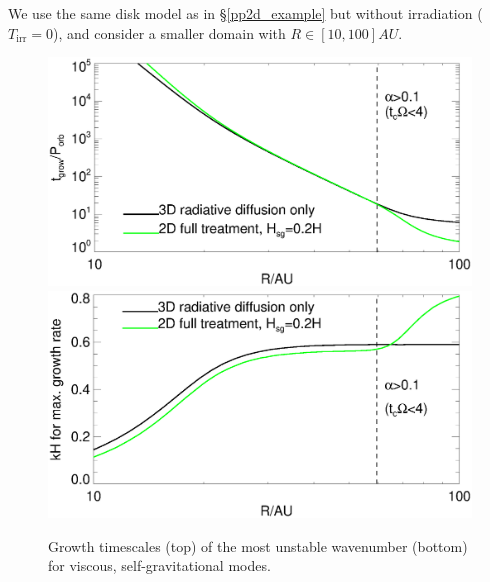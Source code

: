 We use the same disk model as in \S\ref{pp2d_example} but without
irradiation ($T_\mathrm{irr}=0$), and consider a smaller domain
with $R\in[10,100]AU$. 



\begin{figure}
  \includegraphics[width=\linewidth,clip=true,trim=0cm 1.5cm 0cm
    0.0cm]{figures/ppd_3d_rates}\\
  \includegraphics[width=\linewidth,clip=true,trim=0cm 0cm 0cm
    0.8cm]{figures/ppd_3d_maxk}
  \caption{Growth timescales (top) of the most unstable
    wavenumber (bottom) for viscous,
    self-gravitational modes.  
    \label{rafikov_growth3d}}
\end{figure}





